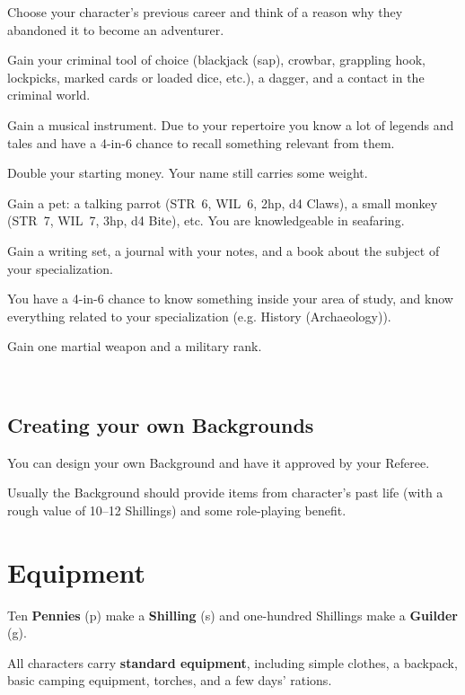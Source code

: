 \documentclass[itdr]{subfiles}
\begin{document}
Choose your character's previous career and think of a reason why they abandoned it to become an adventurer.

Gain your criminal tool of choice (blackjack (sap), crowbar, grappling hook, lockpicks, marked cards or loaded dice, etc.), a dagger, and a contact in the criminal world.

Gain a musical instrument. Due to your repertoire you know a lot of legends and tales and have a 4-in-6 chance to recall something relevant from them.

Double your starting money. Your name still carries some weight.

Gain a pet: a talking parrot (STR~6, WIL~6, 2hp, d4 Claws), a small monkey (STR~7, WIL~7, 3hp, d4 Bite), etc. You are knowledgeable in seafaring.

Gain a writing set, a journal with your notes, and a book about the subject of your specialization.

You have a 4-in-6 chance to know something inside your area of study, and know everything related to your specialization (e.g. History (Archaeology)).

Gain one martial weapon and a military rank.

~

\begin{dbox}
\subsection*{Creating your own Backgrounds}

You can design your own Background and have it approved by your Referee.

Usually the Background should provide items from character's past life (with a rough value of 10--12 Shillings) and some role-playing benefit.
\end{dbox}

\vfill
\clearpage


\section{Equipment}

Ten \textbf{Pennies} (p) make a \textbf{Shilling} (s) and one-hundred Shillings make a \textbf{Guilder} (g).

All characters carry \textbf{standard equipment}, including simple clothes, a backpack, basic camping equipment, torches, and a few days' rations.
\end{document}
